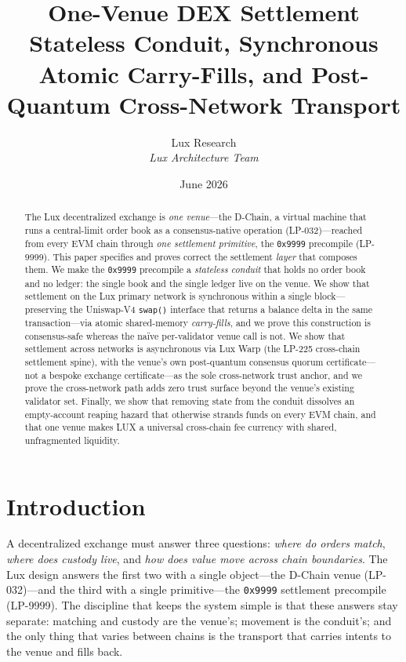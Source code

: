 \documentclass[11pt,a4paper]{article}
\title{One-Venue DEX Settlement\\Stateless Conduit, Synchronous Atomic Carry-Fills, and Post-Quantum Cross-Network Transport}
\author{Lux Research \\
\textit{Lux Architecture Team}}
\date{June 2026}
\begin{document}
\luxcoverpage

\begin{abstract}
The Lux decentralized exchange is \emph{one venue}---the D-Chain, a virtual machine that runs a
central-limit order book as a consensus-native operation (LP-032)---reached from every EVM chain
through \emph{one settlement primitive}, the \texttt{0x9999} precompile (LP-9999). This paper
specifies and proves correct the settlement \emph{layer} that composes them. We make the
\texttt{0x9999} precompile a \emph{stateless conduit} that holds no order book and no ledger:
the single book and the single ledger live on the venue. We show that settlement on the Lux
primary network is synchronous within a single block---preserving the Uniswap-V4
\texttt{swap()} interface that returns a balance delta in the same transaction---via atomic
shared-memory \emph{carry-fills}, and we prove this construction is consensus-safe whereas the
na\"ive per-validator venue call is not. We show that settlement across networks is asynchronous
via Lux Warp (the LP-225 cross-chain settlement spine), with the venue's own post-quantum consensus quorum certificate---not a bespoke
exchange certificate---as the sole cross-network trust anchor, and we prove the cross-network
path adds zero trust surface beyond the venue's existing validator set. Finally, we show that
removing state from the conduit dissolves an empty-account reaping hazard that otherwise strands
funds on every EVM chain, and that one venue makes LUX a universal cross-chain fee currency with
shared, unfragmented liquidity.
\end{abstract}

\tableofcontents

\section{Introduction}

A decentralized exchange must answer three questions: \emph{where do orders match}, \emph{where
does custody live}, and \emph{how does value move across chain boundaries}. The Lux design answers
the first two with a single object---the D-Chain venue (LP-032)---and the third with a single
primitive---the \texttt{0x9999} settlement precompile (LP-9999). The discipline that keeps the
system simple is that these answers stay separate: matching and custody are the venue's; movement
is the conduit's; and the only thing that varies between chains is the transport that carries
intents to the venue and fills back.
\end{document}
